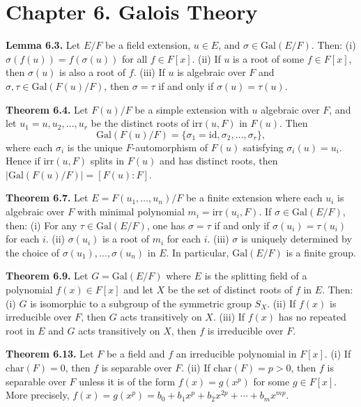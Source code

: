 \documentclass{article}
\newenvironment{theoremx}[1]{\noindent\textbf{Theorem #1.} }{\par}
\newenvironment{lemmax}[1]{\noindent\textbf{Lemma #1.} }{\par}
\begin{document}
\section*{Chapter 6. Galois Theory}

\begin{lemmax}{6.3}
Let $E/F$ be a field extension, $u\in E$, and $\sigma\in\mathrm{Gal}(E/F)$.  Then:
(i) $\sigma(f(u)) = f(\sigma(u))$ for all $f\in F[x]$.
(ii) If $u$ is a root of some $f\in F[x]$, then $\sigma(u)$ is also a root of $f$.
(iii) If $u$ is algebraic over $F$ and $\sigma,\tau\in \mathrm{Gal}(F(u)/F)$, then $\sigma=\tau$ if and only if $\sigma(u)=\tau(u)$.
\end{lemmax}

\begin{theoremx}{6.4}
Let $F(u)/F$ be a simple extension with $u$ algebraic over $F$, and let $u_1=u,u_2,\dots,u_r$ be the distinct roots of $\mathrm{irr}(u,F)$ in $F(u)$.  Then
\[
   \mathrm{Gal}(F(u)/F) = \{\sigma_1=\mathrm{id}, \sigma_2, \dots, \sigma_r\},
\]
where each $\sigma_i$ is the unique $F$-automorphism of $F(u)$ satisfying $\sigma_i(u)=u_i$.  Hence if $\mathrm{irr}(u,F)$ splits in $F(u)$ and has distinct roots, then $|\mathrm{Gal}(F(u)/F)| = [F(u):F]$.
\end{theoremx}

\begin{theoremx}{6.7}
Let $E=F(u_1,\dots,u_n)/F$ be a finite extension where each $u_i$ is algebraic over $F$ with minimal polynomial $m_i = \mathrm{irr}(u_i,F)$.  If $\sigma\in\mathrm{Gal}(E/F)$, then:
(i) For any $\tau\in\mathrm{Gal}(E/F)$, one has $\sigma=\tau$ if and only if $\sigma(u_i)=\tau(u_i)$ for each $i$.
(ii) $\sigma(u_i)$ is a root of $m_i$ for each $i$.
(iii) $\sigma$ is uniquely determined by the choice of $\sigma(u_1),\dots,\sigma(u_n)$ in $E$. 
In particular, $\mathrm{Gal}(E/F)$ is a finite group.
\end{theoremx}

\begin{theoremx}{6.9}
Let $G=\mathrm{Gal}(E/F)$ where $E$ is the splitting field of a polynomial $f(x)\in F[x]$ and let $X$ be the set of distinct roots of $f$ in $E$.  Then:
(i) $G$ is isomorphic to a subgroup of the symmetric group $S_X$.
(ii) If $f(x)$ is irreducible over $F$, then $G$ acts transitively on $X$.
(iii) If $f(x)$ has no repeated root in $E$ and $G$ acts transitively on $X$, then $f$ is irreducible over $F$.
\end{theoremx}

\begin{theoremx}{6.13}
Let $F$ be a field and $f$ an irreducible polynomial in $F[x]$.
(i) If $\mathrm{char}(F)=0$, then $f$ is separable over $F$.
(ii) If $\mathrm{char}(F)=p>0$, then $f$ is separable over $F$ unless it is of the form $f(x)=g(x^p)$ for some $g\in F[x]$.  More precisely, $f(x)=g(x^p)=b_0 + b_1 x^p + b_2x^{2p} + \cdots + b_mx^{mp}$.
\end{theoremx}
\end{document}
